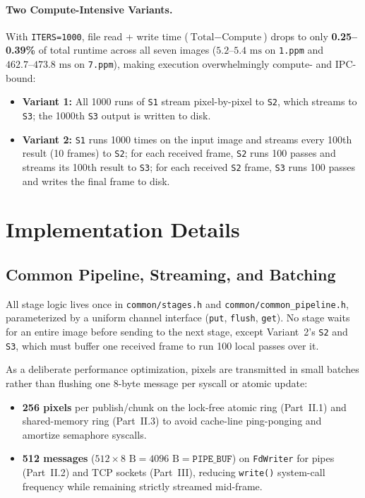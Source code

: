 \documentclass[10pt,a4paper]{article}
\begin{document}
\paragraph{Two Compute-Intensive Variants.}
With \texttt{ITERS=1000}, file read + write time ($\text{Total} - \text{Compute}$) drops to only \textbf{0.25--0.39\%} of total runtime across all seven images ($5.2\text{--}5.4\text{ ms}$ on \texttt{1.ppm} and $462.7\text{--}473.8\text{ ms}$ on \texttt{7.ppm}), making execution overwhelmingly compute- and IPC-bound:
\begin{itemize}
    \item \textbf{Variant 1:} All 1000 runs of \texttt{S1} stream pixel-by-pixel to \texttt{S2}, which streams to \texttt{S3}; the 1000th \texttt{S3} output is written to disk.
    \item \textbf{Variant 2:} \texttt{S1} runs 1000 times on the input image and streams every 100th result (10 frames) to \texttt{S2}; for each received frame, \texttt{S2} runs 100 passes and streams its 100th result to \texttt{S3}; for each received \texttt{S2} frame, \texttt{S3} runs 100 passes and writes the final frame to disk.
\end{itemize}

\section{Implementation Details}

\subsection{Common Pipeline, Streaming, and Batching}
All stage logic lives once in \texttt{common/stages.h} and \texttt{common/common\_pipeline.h}, parameterized by a uniform channel interface (\texttt{put}, \texttt{flush}, \texttt{get}). No stage waits for an entire image before sending to the next stage, except Variant~2's \texttt{S2} and \texttt{S3}, which must buffer one received frame to run 100 local passes over it.

As a deliberate performance optimization, pixels are transmitted in small batches rather than flushing one 8-byte message per syscall or atomic update:
\begin{itemize}
    \item \textbf{256 pixels} per publish/chunk on the lock-free atomic ring (Part~II.1) and shared-memory ring (Part~II.3) to avoid cache-line ping-ponging and amortize semaphore syscalls.
    \item \textbf{512 messages} ($512 \times 8\text{ B} = 4096\text{ B} = \texttt{PIPE\_BUF}$) on \texttt{FdWriter} for pipes (Part~II.2) and TCP sockets (Part~III), reducing \texttt{write()} system-call frequency while remaining strictly streamed mid-frame.
\end{itemize}
\end{document}
